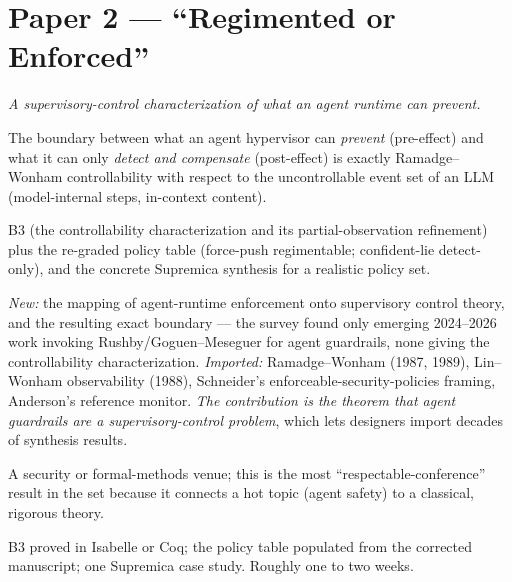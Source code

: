 \documentclass[11pt,a4paper]{article}
\begin{document}
\section{Paper 2 --- ``Regimented or Enforced''}
\emph{A supervisory-control characterization of what an agent runtime can prevent.}
\begin{description}[leftmargin=0em,style=unboxed]
\item[Thesis.] The boundary between what an agent hypervisor can \emph{prevent} (pre-effect) and what it can only \emph{detect and compensate} (post-effect) is exactly Ramadge--Wonham controllability with respect to the uncontrollable event set of an LLM (model-internal steps, in-context content).
\item[Results.] B3 (the controllability characterization and its partial-observation refinement) plus the re-graded policy table (force-push regimentable; confident-lie detect-only), and the concrete Supremica synthesis for a realistic policy set.
\item[Novelty, honestly.] \emph{New:} the mapping of agent-runtime enforcement onto supervisory control theory, and the resulting exact boundary --- the survey found only emerging 2024--2026 work invoking Rushby/Goguen--Meseguer for agent guardrails, none giving the controllability characterization. \emph{Imported:} Ramadge--Wonham (1987, 1989), Lin--Wonham observability (1988), Schneider's enforceable-security-policies framing, Anderson's reference monitor. \emph{The contribution is the theorem that agent guardrails are a supervisory-control problem}, which lets designers import decades of synthesis results.
\item[Venue.] A security or formal-methods venue; this is the most ``respectable-conference'' result in the set because it connects a hot topic (agent safety) to a classical, rigorous theory.
\item[Gate.] B3 proved in Isabelle or Coq; the policy table populated from the corrected manuscript; one Supremica case study. Roughly one to two weeks.
\end{description}
\end{document}
